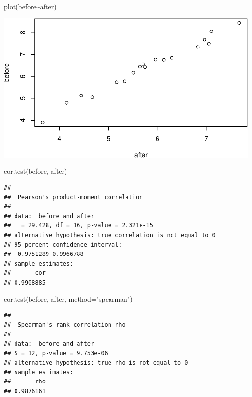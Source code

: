 \documentclass[
]{article}
\newenvironment{Shaded}{\begin{snugshade}}{\end{snugshade}}
\newcommand{\AttributeTok}[1]{\textcolor[rgb]{0.77,0.63,0.00}{#1}}
\newcommand{\FunctionTok}[1]{\textcolor[rgb]{0.00,0.00,0.00}{#1}}
\newcommand{\NormalTok}[1]{#1}
\newcommand{\SpecialCharTok}[1]{\textcolor[rgb]{0.00,0.00,0.00}{#1}}
\newcommand{\StringTok}[1]{\textcolor[rgb]{0.31,0.60,0.02}{#1}}
\begin{document}
\begin{Shaded}
\begin{Highlighting}[]
\FunctionTok{plot}\NormalTok{(before}\SpecialCharTok{\textasciitilde{}}\NormalTok{after)}
\end{Highlighting}
\end{Shaded}

\includegraphics{assignment_1_files/figure-latex/unnamed-chunk-13-1.pdf}

\begin{Shaded}
\begin{Highlighting}[]
\FunctionTok{cor.test}\NormalTok{(before, after)}
\end{Highlighting}
\end{Shaded}

\begin{verbatim}
## 
##  Pearson's product-moment correlation
## 
## data:  before and after
## t = 29.428, df = 16, p-value = 2.321e-15
## alternative hypothesis: true correlation is not equal to 0
## 95 percent confidence interval:
##  0.9751289 0.9966788
## sample estimates:
##       cor 
## 0.9908885
\end{verbatim}

\begin{Shaded}
\begin{Highlighting}[]
\FunctionTok{cor.test}\NormalTok{(before, after, }\AttributeTok{method=}\StringTok{"spearman"}\NormalTok{)}
\end{Highlighting}
\end{Shaded}

\begin{verbatim}
## 
##  Spearman's rank correlation rho
## 
## data:  before and after
## S = 12, p-value = 9.753e-06
## alternative hypothesis: true rho is not equal to 0
## sample estimates:
##       rho 
## 0.9876161
\end{verbatim}
\end{document}

